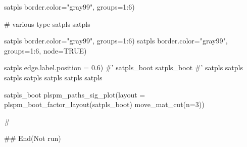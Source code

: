 \documentclass[a4paper]{book}
\begin{document}
\begin{Examples}
\begin{ExampleCode}
satpls %
                            border.color="gray99", groups=1:6)


# various type
satpls %
satpls %

satpls %
                                 border.color="gray99", groups=1:6)
satpls %
                                 border.color="gray99", groups=1:6, node=TRUE)

satpls %
                                 edge.label.position = 0.6)
#'
satpls_boot%
satpls_boot%
#'
satpls %
satpls %
satpls %
satpls %
satpls %
satpls %
satpls %

satpls_boot %
plspm_paths_sig_plot(layout =  plspm_boot_factor_layout(satpls_boot)%
 move_mat_cut(n=3))

\#



## End(Not run)
\end{ExampleCode}
\end{Examples}
\end{document}
